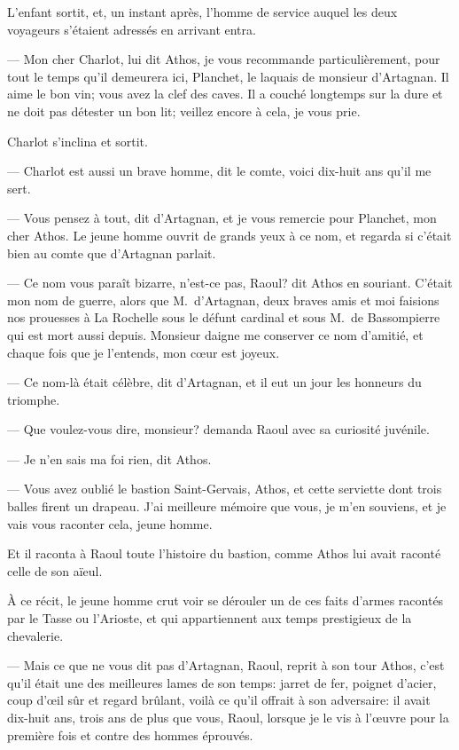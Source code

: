 L'enfant sortit, et, un instant après, l'homme de service auquel les deux voyageurs s'étaient adressés en arrivant entra.

— Mon cher Charlot, lui dit Athos, je vous recommande particulièrement, pour tout le temps qu'il demeurera ici, Planchet, le laquais de monsieur d'Artagnan. Il aime le bon vin; vous avez la clef des caves. Il a couché longtemps sur la dure et ne doit pas détester un bon lit; veillez encore à cela, je vous prie.

Charlot s'inclina et sortit.

— Charlot est aussi un brave homme, dit le comte, voici dix-huit ans qu'il me sert.

— Vous pensez à tout, dit d'Artagnan, et je vous remercie pour Planchet, mon cher Athos.
Le jeune homme ouvrit de grands yeux à ce nom, et regarda si c'était bien au comte que d'Artagnan parlait.

— Ce nom vous paraît bizarre, n'est-ce pas, Raoul? dit Athos en souriant. C'était mon nom de guerre, alors que M.~d'Artagnan, deux braves amis et moi faisions nos prouesses à La Rochelle sous le défunt cardinal et sous M.~de Bassompierre qui est mort aussi depuis. Monsieur daigne me conserver ce nom d'amitié, et chaque fois que je l'entends, mon cœur est joyeux.

— Ce nom-là était célèbre, dit d'Artagnan, et il eut un jour les honneurs du triomphe.

— Que voulez-vous dire, monsieur? demanda Raoul avec sa curiosité juvénile.

— Je n'en sais ma foi rien, dit Athos.

— Vous avez oublié le bastion Saint-Gervais, Athos, et cette serviette dont trois balles firent un drapeau. J'ai meilleure mémoire que vous, je m'en souviens, et je vais vous raconter cela, jeune homme.

Et il raconta à Raoul toute l'histoire du bastion, comme Athos lui avait raconté celle de son aïeul.

À ce récit, le jeune homme crut voir se dérouler un de ces faits d'armes racontés par le Tasse ou l'Arioste, et qui appartiennent aux temps prestigieux de la chevalerie.

— Mais ce que ne vous dit pas d'Artagnan, Raoul, reprit à son tour Athos, c'est qu'il était une des meilleures lames de son temps: jarret de fer, poignet d'acier, coup d'œil sûr et regard brûlant, voilà ce qu'il offrait à son adversaire: il avait dix-huit ans, trois ans de plus que vous, Raoul, lorsque je le vis à l'œuvre pour la première fois et contre des hommes éprouvés.

